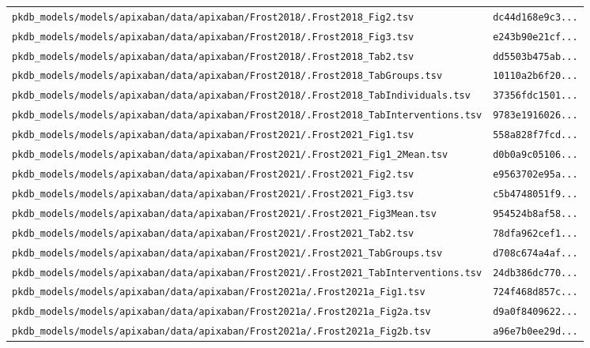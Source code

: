 \begin{longtable}{ll}
\texttt{pkdb\_models/models/apixaban/data/apixaban/Frost2018/.Frost2018\_Fig2.tsv} & \texttt{dc44d168e9c3...} \\
\texttt{pkdb\_models/models/apixaban/data/apixaban/Frost2018/.Frost2018\_Fig3.tsv} & \texttt{e243b90e21cf...} \\
\texttt{pkdb\_models/models/apixaban/data/apixaban/Frost2018/.Frost2018\_Tab2.tsv} & \texttt{dd5503b475ab...} \\
\texttt{pkdb\_models/models/apixaban/data/apixaban/Frost2018/.Frost2018\_TabGroups.tsv} & \texttt{10110a2b6f20...} \\
\texttt{pkdb\_models/models/apixaban/data/apixaban/Frost2018/.Frost2018\_TabIndividuals.tsv} & \texttt{37356fdc1501...} \\
\texttt{pkdb\_models/models/apixaban/data/apixaban/Frost2018/.Frost2018\_TabInterventions.tsv} & \texttt{9783e1916026...} \\
\texttt{pkdb\_models/models/apixaban/data/apixaban/Frost2021/.Frost2021\_Fig1.tsv} & \texttt{558a828f7fcd...} \\
\texttt{pkdb\_models/models/apixaban/data/apixaban/Frost2021/.Frost2021\_Fig1\_2Mean.tsv} & \texttt{d0b0a9c05106...} \\
\texttt{pkdb\_models/models/apixaban/data/apixaban/Frost2021/.Frost2021\_Fig2.tsv} & \texttt{e9563702e95a...} \\
\texttt{pkdb\_models/models/apixaban/data/apixaban/Frost2021/.Frost2021\_Fig3.tsv} & \texttt{c5b4748051f9...} \\
\texttt{pkdb\_models/models/apixaban/data/apixaban/Frost2021/.Frost2021\_Fig3Mean.tsv} & \texttt{954524b8af58...} \\
\texttt{pkdb\_models/models/apixaban/data/apixaban/Frost2021/.Frost2021\_Tab2.tsv} & \texttt{78dfa962cef1...} \\
\texttt{pkdb\_models/models/apixaban/data/apixaban/Frost2021/.Frost2021\_TabGroups.tsv} & \texttt{d708c674a4af...} \\
\texttt{pkdb\_models/models/apixaban/data/apixaban/Frost2021/.Frost2021\_TabInterventions.tsv} & \texttt{24db386dc770...} \\
\texttt{pkdb\_models/models/apixaban/data/apixaban/Frost2021a/.Frost2021a\_Fig1.tsv} & \texttt{724f468d857c...} \\
\texttt{pkdb\_models/models/apixaban/data/apixaban/Frost2021a/.Frost2021a\_Fig2a.tsv} & \texttt{d9a0f8409622...} \\
\texttt{pkdb\_models/models/apixaban/data/apixaban/Frost2021a/.Frost2021a\_Fig2b.tsv} & \texttt{a96e7b0ee29d...} \\

\end{longtable}
